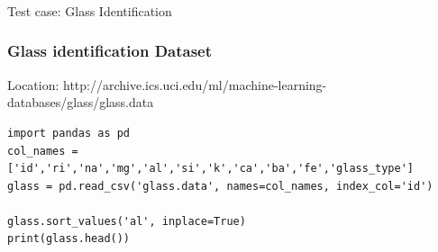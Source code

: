 





\begin{frame}[fragile]\frametitle{}
\begin{center}
{\Large Test case: Glass Identification}
\end{center}
\end{frame}

\begin{frame}[fragile]\frametitle{Glass identification Dataset}
Location: http://archive.ics.uci.edu/ml/machine-learning-databases/glass/glass.data
\begin{lstlisting}
import pandas as pd
col_names = ['id','ri','na','mg','al','si','k','ca','ba','fe','glass_type']
glass = pd.read_csv('glass.data', names=col_names, index_col='id')

glass.sort_values('al', inplace=True)
print(glass.head())
\end{lstlisting}
\end{frame}


